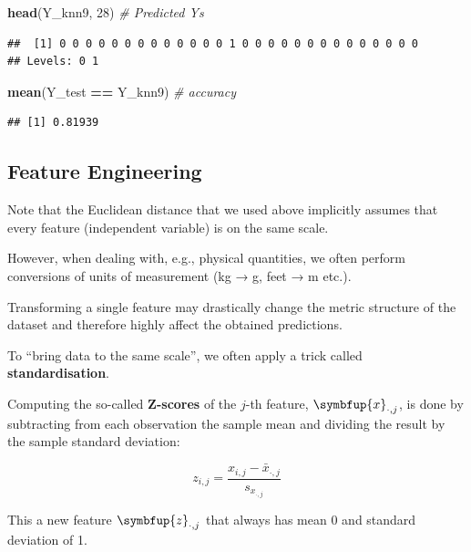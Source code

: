 \documentclass[10pt,b5paper,krantz1]{krantz}
\newenvironment{Shaded}{\begin{snugshade}}{\end{snugshade}}
\newcommand{\CommentTok}[1]{\textcolor[rgb]{0.37,0.37,0.37}{\textit{#1}}}
\newcommand{\DecValTok}[1]{\textcolor[rgb]{0.06,0.06,0.06}{#1}}
\newcommand{\KeywordTok}[1]{\textcolor[rgb]{0.27,0.27,0.27}{\textbf{#1}}}
\newcommand{\NormalTok}[1]{#1}
\newcommand{\OperatorTok}[1]{\textcolor[rgb]{0.43,0.43,0.43}{\textbf{#1}}}
\newcommand{\StringTok}[1]{\textcolor[rgb]{0.5,0.5,0.5}{#1}}
\renewcommand{\mathbf}[1]{\symbfup{#1}}
\begin{document}
\begin{Shaded}
\begin{Highlighting}[]
\KeywordTok{head}\NormalTok{(Y_knn9, }\DecValTok{28}\NormalTok{) }\CommentTok{# Predicted Ys}
\end{Highlighting}
\end{Shaded}

\begin{verbatim}
##  [1] 0 0 0 0 0 0 0 0 0 0 0 0 0 1 0 0 0 0 0 0 0 0 0 0 0 0 0 0
## Levels: 0 1
\end{verbatim}

\begin{Shaded}
\begin{Highlighting}[]
\KeywordTok{mean}\NormalTok{(Y_test }\OperatorTok{==}\StringTok{ }\NormalTok{Y_knn9) }\CommentTok{# accuracy}
\end{Highlighting}
\end{Shaded}

\begin{verbatim}
## [1] 0.81939
\end{verbatim}

\hypertarget{feature-engineering}{%
\subsection{Feature Engineering}\label{feature-engineering}}

Note that the Euclidean distance that we used above
implicitly assumes that every feature (independent variable)
is on the same scale.

However, when dealing with, e.g., physical quantities,
we often perform conversions of units of measurement (kg → g, feet → m etc.).

Transforming a single feature may drastically change the metric
structure of the dataset
and therefore highly affect the obtained predictions.

To ``bring data to the same scale'', we often apply a trick called \textbf{standardisation}.

Computing the so-called \textbf{Z-scores} of the \(j\)-th feature, \(\mathbf{x}_{\cdot,j}\),
is done by subtracting from each observation the sample mean and dividing the result by the sample
standard deviation:

\[z_{i,j} = \frac{x_{i,j}-\bar{x}_{\cdot,j}}{s_{x_{\cdot,j}}}\]

This a new feature \(\mathbf{z}_{\cdot,j}\) that always has mean 0 and standard deviation of 1.
\end{document}
